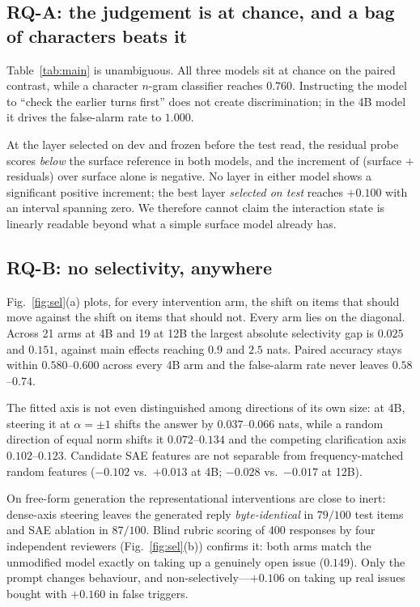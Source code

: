 \documentclass[conference]{IEEEtran}
\begin{document}
\subsection{RQ-A: the judgement is at chance, and a bag of characters beats it}
Table~\ref{tab:main} is unambiguous. All three models sit at chance on the paired contrast, while a
character $n$-gram classifier reaches $0.760$. Instructing the model to ``check the earlier turns
first'' does not create discrimination; in the 4B model it drives the false-alarm rate to $1.000$.

At the layer selected on dev and frozen before the test read, the residual probe scores
\emph{below} the surface reference in both models, and the increment of (surface $+$ residuals) over
surface alone is negative. No layer in either model shows a significant positive increment; the best
layer \emph{selected on test} reaches $+0.100$ with an interval spanning zero. We therefore cannot
claim the interaction state is linearly readable beyond what a simple surface model already has.

\subsection{RQ-B: no selectivity, anywhere}
Fig.~\ref{fig:sel}(a) plots, for every intervention arm, the shift on items that should move against
the shift on items that should not. Every arm lies on the diagonal. Across 21 arms at 4B and 19 at
12B the largest absolute selectivity gap is $0.025$ and $0.151$, against main effects reaching
$0.9$ and $2.5$ nats. Paired accuracy stays within $0.580$--$0.600$ across every 4B arm and the
false-alarm rate never leaves $0.58$--$0.74$.

The fitted axis is not even distinguished among directions of its own size: at 4B, steering it at
$\alpha=\pm1$ shifts the answer by $0.037$--$0.066$ nats, while a random direction of equal norm
shifts it $0.072$--$0.134$ and the competing clarification axis $0.102$--$0.123$. Candidate SAE
features are not separable from frequency-matched random features ($-0.102$ vs.\ $+0.013$ at 4B;
$-0.028$ vs.\ $-0.017$ at 12B).

On free-form generation the representational interventions are close to inert: dense-axis steering
leaves the generated reply \emph{byte-identical} in $79/100$ test items and SAE ablation in
$87/100$. Blind rubric scoring of 400 responses by four independent reviewers
(Fig.~\ref{fig:sel}(b)) confirms it: both arms match the unmodified model exactly on taking up a
genuinely open issue ($0.149$). Only the prompt changes behaviour, and non-selectively---$+0.106$
on taking up real issues bought with $+0.160$ in false triggers.
\end{document}
